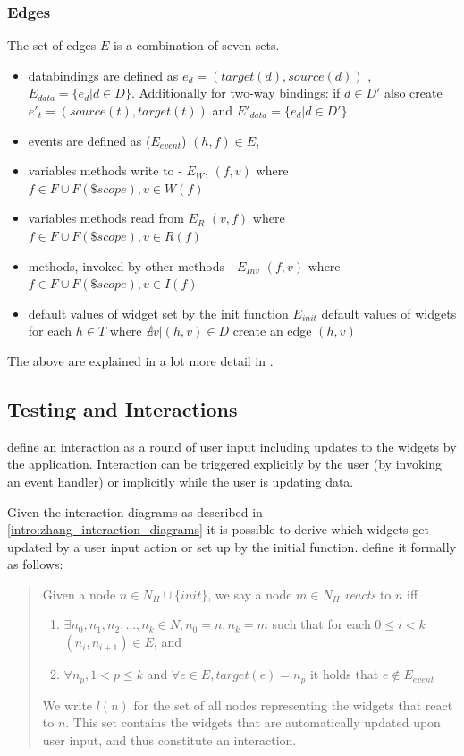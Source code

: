 \subsubsection{Edges}
The set of edges $E$ is a combination of seven sets.

\begin{itemize}
  \item \glspl{databinding} are defined as $e_d = (target(d),source(d))$ , $E_{data} = \{e_d |  d \in D \}$. Additionally for two-way bindings: if $d \in D'$ also create $e'_t = (source(t),target(t))$ and $E'_{data} = \{e_d |  d \in D' \}$
\item events are defined as ($E_{event}$) $(h,f) \in E$,
\item variables methods write to - $E_{W}$, $(f,v)$ where $f \in F \cup F(\$scope), v \in W(f)$
\item variables methods read from $E_{R}$ $(v,f)$ where $f \in F \cup F(\$scope), v \in R(f)$
\item methods, invoked by other methods - $E_{Inv}$ $(f,v)$ where $f \in F \cup F(\$scope), v \in I(f)$
\item  default values of widget set by the init function
$E_{init}$ default values of widgets 
for each $h \in T $ where $ \nexists v | (h,v) \in D$ create an edge $(h,v)$ 
\end{itemize}
The above are explained in a lot more detail in \parencite[9]{zhang2019scenario}.

\subsection{Testing and Interactions}
\textcite{zhang2019scenario} define an interaction as a round of user input including updates to the widgets by the application. Interaction can be triggered explicitly by the user (by invoking an event handler) or implicitly while the user is updating data. \parencite{zhang2019scenario}

Given the interaction diagrams as described in \ref{intro:zhang_interaction_diagrams} it is possible to derive which widgets get updated by a user input action or set up by the initial function. \textcite{zhang2019scenario} define it formally as follows:
\begin{quote}
\label{quote:interactions}
Given a node $n \in N_H \cup \{init\}$, we say a node $m \in N_H$ \textit{reacts} to $n$ iff
  \begin{enumerate}
      \item $\exists n_0,n_1,n_2, \ldots,n_k \in N, n_0=n,n_k=m$ such that for each $0 \leq i < k  $ $(n_i,n_{i+1}) \in E$, and 
      \item $\forall n_p, 1 < p \leq k$ and $\forall e \in E, target(e)= n_p$ it holds that $e \notin E_{event}$  
  \end{enumerate}
  We write $l(n)$ for the set of all nodes representing the widgets that react to $n$. This set contains the widgets that are automatically updated upon user input,
  and thus constitute an interaction.
  \end{quote}


